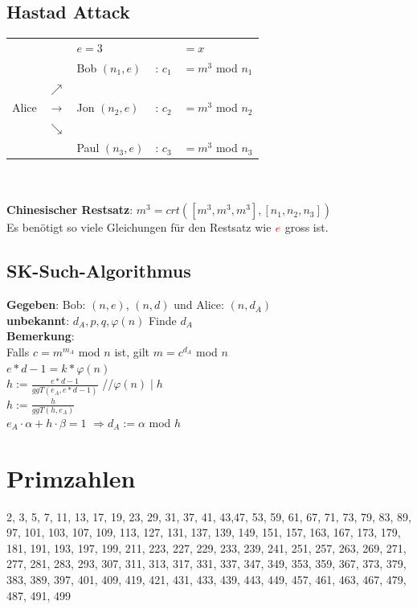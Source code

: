\documentclass[landscape,twocolumn,a4paper]{article}
\newcommand{\Ra}{\Rightarrow}
\begin{document}
\subsection{Hastad Attack}
\begin{tabular}{l l l l l}
    & & {\color{red} $e=3$} & & $=x$ \\
	&  & Bob $(n_1,e)$ & : {\color{red}$c_1$} & $= m^3$ mod $n_1$\\
	&$\nearrow$  \\
	Alice & $\rightarrow$ & Jon $(n_2,e)$ & : {\color{red}$c_2$} & $= m^3$ mod $n_2$\\
	& $\searrow$ \\
	& & Paul $(n_3,e)$ & : {\color{red}$c_3$} & $= m^3$ mod $n_3$
\end{tabular} \\ \\
\textbf{Chinesischer Restsatz}: $m^3= crt([m^3,m^3,m^3],[n_1,n_2,n_3])$ \\
Es benötigt so viele Gleichungen für den Restsatz wie ${\color{red}e}$ gross ist.

\subsection{SK-Such-Algorithmus}
{
\textbf{Gegeben}: Bob: $(n,e)$, $(n,d)$ und Alice: $(n,d_A)$ \\
\textbf{unbekannt}: $d_A,p,q,\varphi(n)$ Finde $d_A$ \\
\textbf{Bemerkung}: \\
    Falls $c=m^{m_A}$ mod $n$ ist, gilt $m=c^{d_A}$ mod $n$ \\
    $e*d-1=k*\varphi(n)$ \\
    $h:=\frac{e*d-1}{ggT(e_A,e*d-1)}$ \hspace*{2cm}//$\varphi(n)\mid h$\\
    $h:=\frac{h}{ggT(h,e_A)}$ \\
    $e_A\cdot\alpha+h\cdot\beta=1 $ {\color{red}$\Ra d_A:=\alpha$ mod $h$}
}

\section{Primzahlen}
{2, 3, 5, 7,    11,    13,    17,    19,    23,    29,    31,    37,    41,    43,47,    53,    59,    61,    67,    71,    73,    79,    83,    89,    97,   101,   103,   107,
  109,   113,   127,   131,   137,   139,   149,   151,   157,   163,   167,   173,   179,   181,
  191,   193,   197,   199,   211,   223,   227,   229,   233,   239,   241,   251,   257,   263,
  269,   271,   277,   281,   283,   293,   307,   311,   313,   317,   331,   337,   347,   349,
  353,   359,   367,   373,   379,   383,   389,   397,   401,   409,   419,   421,   431,   433,
  439,   443,   449,   457,   461,   463,   467,   479,   487,   491,   499}
 
\end{document}
